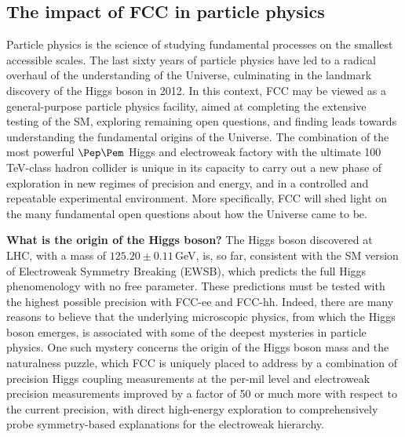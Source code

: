 \subsection{The impact of FCC in particle physics}
\label{sec:PhysicsCaseIntro}

Particle physics is the science of studying fundamental processes on the smallest accessible scales. 
The last sixty years of particle physics have led to a radical overhaul of the understanding of the Universe, 
culminating in the landmark discovery of the Higgs boson in 2012. 
In this context, FCC may be viewed as a general-purpose particle physics facility, aimed at completing the extensive testing of the SM, 
exploring remaining open questions, and finding leads towards understanding the fundamental origins of the Universe. 
The combination of the most powerful $\epem$ Higgs and electroweak factory with the ultimate 100\,TeV-class hadron collider 
is unique in its capacity to carry out a new phase of exploration in new regimes of precision and energy, 
and in a controlled and repeatable experimental environment. 
More specifically, FCC will shed light on the many fundamental open questions about how the Universe came to be.

\textbf{What is the origin of the Higgs boson?}  
The Higgs boson discovered at LHC, with a mass of $125.20 \pm 0.11$\,GeV, 
is, so far, consistent with the SM version of Electroweak Symmetry Breaking (EWSB), 
which predicts the full Higgs phenomenology with no free parameter. 
These predictions must be tested with the highest possible precision with FCC-ee and FCC-hh. 
Indeed, there are many reasons to believe that the underlying microscopic physics, from which the Higgs boson emerges, 
is associated with some of the deepest mysteries in particle physics.  
One such mystery concerns the origin of the Higgs boson mass and the naturalness puzzle, 
which FCC is uniquely placed to address by a combination of precision Higgs coupling measurements at the per-mil level 
and electroweak precision measurements improved by a factor of 50 or much more with respect to the current precision,
with direct high-energy exploration to comprehensively probe symmetry-based explanations for the electroweak hierarchy.

